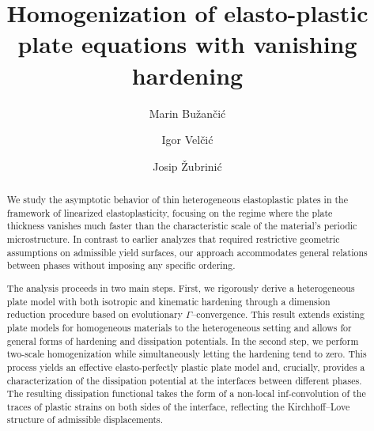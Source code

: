 \documentclass[reqno,10pt]{amsart}
\title{Homogenization of elasto-plastic plate equations with vanishing hardening}
\author[M. Bu\v{z}an\v{c}i\'{c}]{Marin Bu\v{z}an\v{c}i\'{c}}
\author[I. Vel\v{c}i\'{c}]{Igor Vel\v{c}i\'{c}}
\author[J. \v{Z}ubrini\'{c}]{Josip \v{Z}ubrini\'{c}}
\numberwithin{equation}{section}
\theoremstyle{remark}
\begin{document}
\begin{abstract}

We study the asymptotic behavior of thin heterogeneous elastoplastic plates in the framework of linearized elastoplasticity, focusing on the regime where the plate thickness vanishes much faster than the characteristic scale of the material's periodic microstructure.
In contrast to earlier analyzes that required restrictive geometric assumptions on admissible yield surfaces, our approach accommodates general relations between phases without imposing any specific ordering.

The analysis proceeds in two main steps.
First, we rigorously derive a heterogeneous plate model with both isotropic and kinematic hardening through a dimension reduction procedure based on evolutionary $\Gamma$--convergence.
This result extends existing plate models for homogeneous materials to the heterogeneous setting and allows for general forms of hardening and dissipation potentials.
In the second step, we perform two-scale homogenization while simultaneously letting the hardening tend to zero.
This process yields an effective elasto-perfectly plastic plate model and, crucially, provides a characterization of the dissipation potential at the interfaces between different phases.
The resulting dissipation functional takes the form of a non-local inf-convolution of the traces of plastic strains on both sides of the interface, reflecting the Kirchhoff--Love structure of admissible displacements.
\end{abstract}

\maketitle
\end{document}
